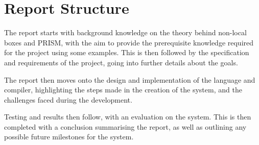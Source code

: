 \documentclass[report.tex]{subfiles}
\begin{document}
\section{Report Structure} %
\label{sec:report_structure}
The report starts with background knowledge on the theory behind non-local boxes
and PRISM, with the aim to provide the prerequisite knowledge required for the
project using some examples. This is then followed by the specification and
requirements of the project, going into further details about the goals.

The report then moves onto the design and implementation of the language and
compiler, highlighting the steps made in the creation of the system, and the
challenges faced during the development.

Testing and results then follow, with an evaluation on the system. This is then
completed with a conclusion summarising the report, as well as outlining any
possible future milestones for the system.
\newpage
\end{document}
